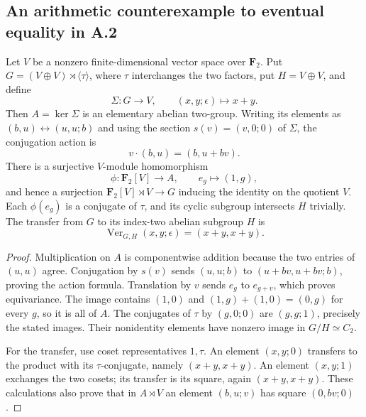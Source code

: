 \subsection{An arithmetic counterexample to eventual equality in A.2}

\begin{lemma}
\label{C:A2-wreath-calculation}
Let $V$ be a nonzero finite-dimensional vector space over $\mathbf F_2$.
Put $G=(V\oplus V)\rtimes\langle\tau\rangle$, where $\tau$ interchanges
the two factors, put $H=V\oplus V$, and define
\[
 \Sigma:G\longrightarrow V,\qquad (x,y;\epsilon)\longmapsto x+y.
\]
Then $A=\ker\Sigma$ is an elementary abelian two-group. Writing its
elements as $(b,u)\leftrightarrow(u,u;b)$ and using the section
$s(v)=(v,0;0)$ of $\Sigma$, the conjugation action is
\[
                 v\cdot(b,u)=(b,u+bv).
\]
There is a surjective $V$-module homomorphism
\[
 \phi:\mathbf F_2[V]\longrightarrow A,
 \qquad e_g\longmapsto(1,g),
\]
and hence a surjection $\mathbf F_2[V]\rtimes V\to G$ inducing the
identity on the quotient $V$. Each $\phi(e_g)$ is a conjugate of
$\tau$, and its cyclic subgroup intersects $H$ trivially.
The transfer from $G$ to its index-two abelian subgroup $H$ is
\[
             \operatorname{Ver}_{G,H}(x,y;\epsilon)
                    =(x+y,x+y).
\]
\end{lemma}
\begin{proof}
Multiplication on $A$ is componentwise addition because the two entries
of $(u,u)$ agree. Conjugation by $s(v)$ sends $(u,u;b)$ to
$(u+bv,u+bv;b)$, proving the action formula. Translation by $v$ sends
$e_g$ to $e_{g+v}$, which proves equivariance. The image contains
$(1,0)$ and $(1,g)+(1,0)=(0,g)$ for every $g$, so it is all of $A$.
The conjugates of $\tau$ by $(g,0;0)$ are $(g,g;1)$, precisely the
stated images. Their nonidentity elements have nonzero image in
$G/H\simeq C_2$.

For the transfer, use coset representatives $1,\tau$. An element
$(x,y;0)$ transfers to the product with its $\tau$-conjugate,
namely $(x+y,x+y)$. An element $(x,y;1)$ exchanges the two cosets;
its transfer is its square, again $(x+y,x+y)$. These calculations
also prove that in $A\rtimes V$ an element $(b,u;v)$ has square
$(0,bv;0)$.
\end{proof}

